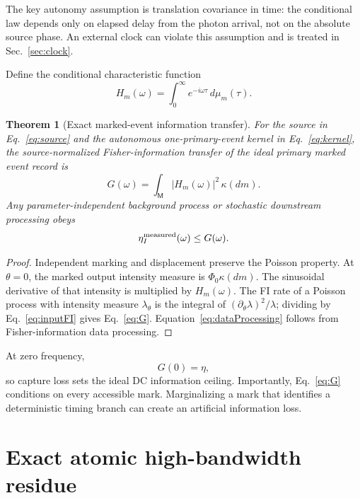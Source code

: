 \documentclass[aps,prapplied,preprint,nofootinbib]{revtex4-2}
\newtheorem{theorem}{Theorem}
\newcommand{\M}{\mathsf M}
\begin{document}
The key autonomy assumption is translation covariance in time: the conditional law depends only on elapsed delay from the photon arrival, not on the absolute source phase.  An external clock can violate this assumption and is treated in Sec.~\ref{sec:clock}.

Define the conditional characteristic function
\begin{equation}
H_m(\omega)=\int_0^\infty e^{-i\omega\tau}\,d\mu_m(\tau).
\label{eq:Hm}
\end{equation}

\begin{theorem}[Exact marked-event information transfer]
For the source in Eq.~\eqref{eq:source} and the autonomous one-primary-event kernel in Eq.~\eqref{eq:kernel}, the source-normalized Fisher-information transfer of the ideal primary marked event record is
\begin{equation}
\boxed{
G(\omega)=\int_{\M}|H_m(\omega)|^2\,\kappa(dm).}
\label{eq:G}
\end{equation}
Any parameter-independent background process or stochastic downstream processing obeys
\begin{equation}
\eta_I^{\rm measured}(\omega)\le G(\omega).
\label{eq:dataProcessing}
\end{equation}
\end{theorem}

\begin{proof}
Independent marking and displacement preserve the Poisson property.  At $\theta=0$, the marked output intensity measure is $\Phi_0\kappa(dm)$.  The sinusoidal derivative of that intensity is multiplied by $H_m(\omega)$.  The FI rate of a Poisson process with intensity measure $\lambda_\theta$ is the integral of $(\partial_\theta\lambda)^2/\lambda$; dividing by Eq.~\eqref{eq:inputFI} gives Eq.~\eqref{eq:G}.  Equation~\eqref{eq:dataProcessing} follows from Fisher-information data processing.
\end{proof}

At zero frequency,
\begin{equation}
G(0)=\eta,
\end{equation}
so capture loss sets the ideal DC information ceiling.  Importantly, Eq.~\eqref{eq:G} conditions on every accessible mark.  Marginalizing a mark that identifies a deterministic timing branch can create an artificial information loss.

\section{Exact atomic high-bandwidth residue}
\label{sec:wiener}
\end{document}
